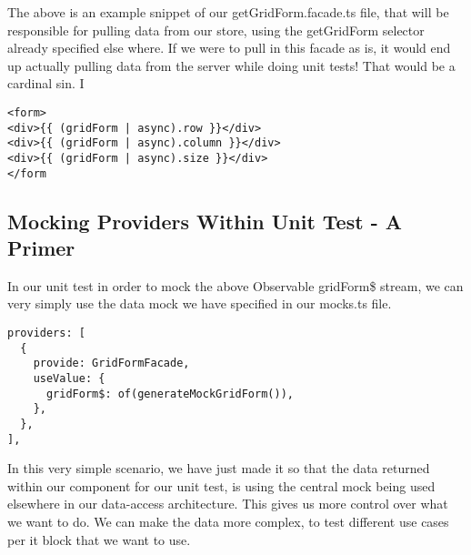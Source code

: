 The above is an example snippet of our getGridForm.facade.ts file, that will
be responsible for pulling data from our store, using the getGridForm selector
already specified else where. If we were to pull in this facade as is, it would
end up actually pulling data from the server while doing unit tests! That would
be a cardinal sin. I
\begin{verbatim}
<form>
<div>{{ (gridForm | async).row }}</div>
<div>{{ (gridForm | async).column }}</div>
<div>{{ (gridForm | async).size }}</div>
</form
\end{verbatim}

\subsection{ Mocking Providers Within Unit Test - A Primer }
In our unit test in order to mock the above Observable gridForm\$ stream, we
can very simply use the data mock we have specified in our mocks.ts file.
\begin{lstlisting}
providers: [
  {
    provide: GridFormFacade,
    useValue: {
      gridForm$: of(generateMockGridForm()),
    },
  },
],
\end{lstlisting}

In this very simple scenario, we have just made it so that the data returned
within our component for our unit test, is using the central mock being used
elsewhere in our data-access architecture. This gives us more control over what
we want to do. We can make the data more complex, to test different use cases
per it block that we want to use.

